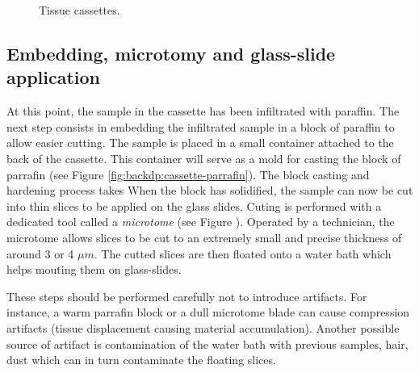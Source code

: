 \begin{figure}
  \centering
  \quad
  \caption{Tissue cassettes.}
\end{figure}

\subsection{Embedding, microtomy and glass-slide application}
\label{ssec:backdp:embedding}

At this point, the sample in the cassette has been infiltrated with paraffin. The next step consists in embedding the infiltrated sample in a block of paraffin to allow easier cutting. The sample is placed in a small container attached to the back of the cassette. This container will serve as a mold for casting the block of parrafin (see Figure \ref{fig:backdp:cassette-parrafin}). The block casting and hardening process takes When the block has solidified, the sample can now be cut into thin slices to be applied on the glass slides. Cuting is performed with a dedicated tool called a \textit{microtome} (see Figure ). Operated by a technician, the microtome allows slices to be cut to an extremely small and precise thickness of around 3 or 4 $\mu m$. The cutted slices are then floated onto a water bath which helps mouting them on glass-slides. 

These steps should be performed carefully not to introduce artifacts. For instance, a warm parrafin block or a dull microtome blade can cause compression artifacts (\ie tissue displacement causing material accumulation). Another possible source of artifact is contamination of the water bath with previous samples, hair, dust which can in turn contaminate the floating slices.   

